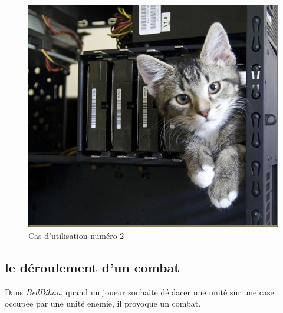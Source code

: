 		\begin{figure}
			\begin{center}
				\includegraphics[width=1\textwidth]{figure/cas_utilisation_2.jpg}
			\end{center}
			\caption{Cas d'utilisation numéro 2}
			\label{fig:use2}
		\end{figure}


	\subsection{le déroulement d'un combat}


		Dans \emph{BedBihan}, quand un joueur souhaite déplacer une unité sur une case occupée par une unité enemie, il provoque un combat. 

